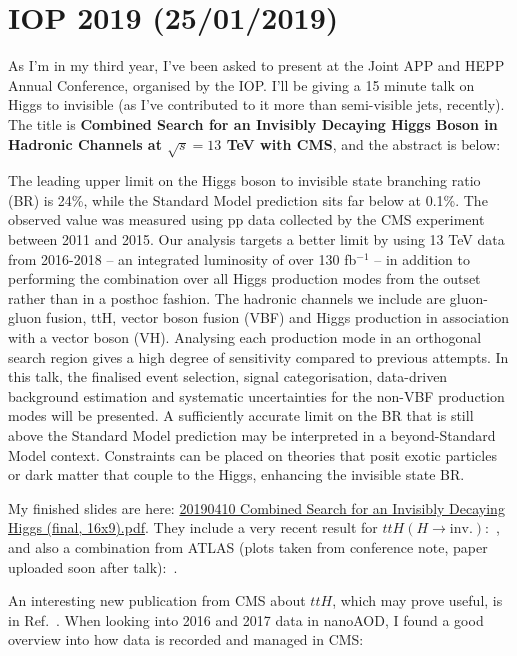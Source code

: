 \section{IOP 2019 (25/01/2019)}

As I'm in my third year, I've been asked to present at the Joint APP and HEPP Annual Conference, organised by the IOP. I'll be giving a 15 minute talk on Higgs to invisible (as I've contributed to it more than semi-visible jets, recently). The title is \textbf{Combined Search for an Invisibly Decaying Higgs Boson in Hadronic Channels at $\sqrt{s} = 13$ TeV with CMS}, and the abstract is below:

The leading upper limit on the Higgs boson to invisible state branching ratio (BR) is 24\%, while the Standard Model prediction sits far below at 0.1\%. The observed value was measured using pp data collected by the CMS experiment between 2011 and 2015. Our analysis targets a better limit by using 13 TeV data from 2016-2018 -- an integrated luminosity of over 130 fb$^{-1}$ -- in addition to performing the combination over all Higgs production modes from the outset rather than in a posthoc fashion. The hadronic channels we include are gluon-gluon fusion, ttH, vector boson fusion (VBF) and Higgs production in association with a vector boson (VH). Analysing each production mode in an orthogonal search region gives a high degree of sensitivity compared to previous attempts. In this talk, the finalised event selection, signal categorisation, data-driven background estimation and systematic uncertainties for the non-VBF production modes will be presented. A sufficiently accurate limit on the BR that is still above the Standard Model prediction may be interpreted in a beyond-Standard Model context. Constraints can be placed on theories that posit exotic particles or dark matter that couple to the Higgs, enhancing the invisible state BR.

My finished slides are here: \href{run:./sec37/20190410 Combined Search for an Invisibly Decaying Higgs (final, 16x9).pdf}{20190410 Combined Search for an Invisibly Decaying Higgs (final, 16x9).pdf}. They include a very recent result for $ttH (H \rightarrow \mathrm{inv.})$:~\cite{CMS-PAS-HIG-18-008}, and also a combination from ATLAS (plots taken from conference note, paper uploaded soon after talk):~\cite{Aaboud:2019rtt}.


An interesting new publication from CMS about $ttH$, which may prove useful, is in Ref.~\cite{PhysRevLett.120.231801}.
When looking into 2016 and 2017 data in nanoAOD, I found a good overview into how data is recorded and managed in CMS: %
